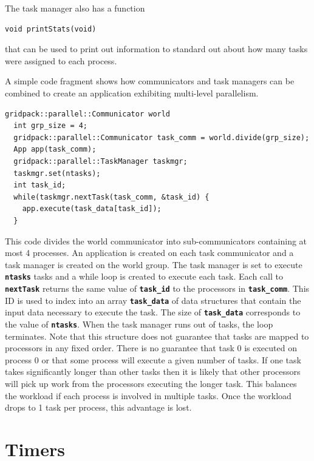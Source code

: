 \documentclass[12pt]{report} %
\begin{document}
The task manager also has a function

{
\color{red}
\begin{Verbatim}[fontseries=b]
void printStats(void)
\end{Verbatim}
}

that can be used to print out information to standard out about how many tasks were assigned to each process.

A simple code fragment shows how communicators and task managers can be combined to create an application exhibiting multi-level parallelism.

{
\color{red}
\begin{Verbatim}[fontseries=b]
  gridpack::parallel::Communicator world
  int grp_size = 4;
  gridpack::parallel::Communicator task_comm = world.divide(grp_size);
  App app(task_comm);
  gridpack::parallel::TaskManager taskmgr;
  taskmgr.set(ntasks);
  int task_id;
  while(taskmgr.nextTask(task_comm, &task_id) {
    app.execute(task_data[task_id]);
  }
\end{Verbatim}
}

This code divides the world communicator into sub-communicators containing at most 4 processes. An application is created on each task communicator and a task manager is created on the world group. The task manager is set to execute \texttt{\textbf{ntasks}} tasks and a while loop is created to execute each task. Each call to \texttt{\textbf{nextTask}} returns the same value of \texttt{\textbf{task\_id}} to the processors in \texttt{\textbf{task\_comm}}. This ID is used to index into an array \texttt{\textbf{task\_data}} of data structures that contain the input data necessary to execute the task. The size of \texttt{\textbf{task\_data}} corresponds to the value of \texttt{\textbf{ntasks}}. When the task manager runs out of tasks, the loop terminates. Note that this structure does not guarantee that tasks are mapped to processors in any fixed order. There is no guarantee that task 0 is executed on process 0 or that some process will execute a given number of tasks. If one task takes significantly longer than other tasks then it is likely that other processors will pick up work from the processors executing the longer task. This balances the workload if each process is involved in multiple tasks. Once the workload drops to 1 task per process, this advantage is lost.

\section{Timers}
\end{document}
